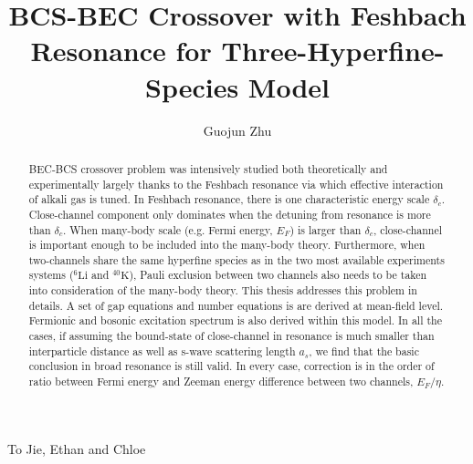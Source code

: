 \documentclass[edeposit,fullpage,prequest]{uiucthesis2009}
\begin{document}
\title{BCS-BEC Crossover with Feshbach Resonance for Three-Hyperfine-Species Model}
\author{Guojun Zhu}
\phdthesis
{}
\maketitle

\frontmatter

%
\begin{abstract}
BEC-BCS crossover problem was intensively studied both theoretically and experimentally largely thanks to the Feshbach resonance via which effective interaction of alkali gas is tuned.  In Feshbach resonance, there is one characteristic energy scale $\delta_c$. Close-channel component only dominates when the detuning from resonance is more than $\delta_c$.  When many-body scale (e.g. Fermi energy, $E_{F}$) is larger than $\delta_c$, close-channel is important enough to be included into the many-body theory.  Furthermore, when two-channels share the same hyperfine species as in the two most available experiments systems (${}^6\text{Li}$ and ${}^{40}\text{K}$), Pauli exclusion between two channels also needs to be taken into consideration of the many-body theory.  This thesis addresses this problem in details. A set of gap equations and number equations is are derived at mean-field level.  Fermionic and bosonic excitation spectrum is also derived within this model.  In all the cases, if assuming the bound-state of close-channel in resonance is much smaller than interparticle distance as well as s-wave scattering length $a_s$, we find that  the basic conclusion in broad resonance is still valid. In every case, correction is  in the  order of ratio between Fermi energy and Zeeman energy difference between two channels, $E_F/\eta$.  
\end{abstract}

\begin{dedication}
To Jie, Ethan and Chloe
\end{dedication}
\end{document}
